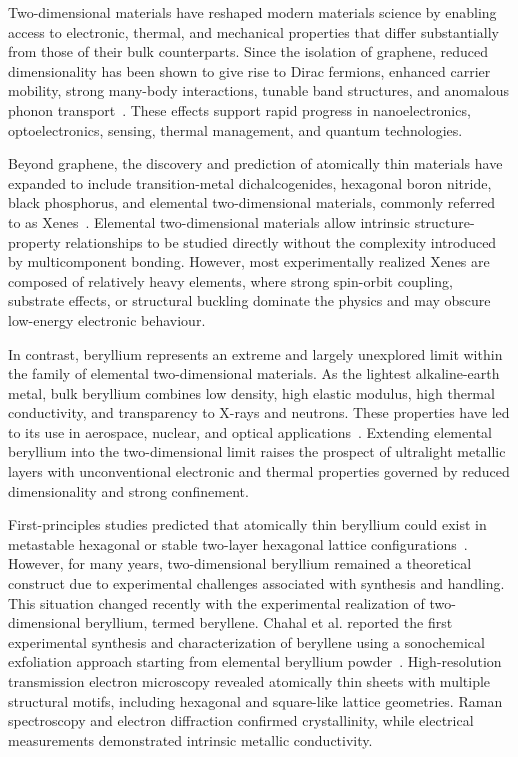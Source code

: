 Two-dimensional materials have reshaped modern materials science by enabling access to electronic,
thermal,
and mechanical properties that differ substantially from those of their bulk counterparts.
Since the isolation of graphene,
reduced dimensionality has been shown to give rise to Dirac fermions,
enhanced carrier mobility,
strong many-body interactions,
tunable band structures,
and anomalous phonon transport~\cite{novoselov2004electric,geim2007rise}.
These effects support rapid progress in nanoelectronics,
optoelectronics,
sensing,
thermal management,
and quantum technologies.

Beyond graphene,
the discovery and prediction of atomically thin materials have expanded to include transition-metal dichalcogenides,
hexagonal boron nitride,
black phosphorus,
and elemental two-dimensional materials,
commonly referred to as Xenes~\cite{butler2013progress,molle2018silicene}.
Elemental two-dimensional materials allow intrinsic structure-property relationships to be studied directly without the complexity introduced by multicomponent bonding.
However,
most experimentally realized Xenes are composed of relatively heavy elements,
where strong spin-orbit coupling,
substrate effects,
or structural buckling dominate the physics and may obscure low-energy electronic behaviour.

In contrast,
beryllium represents an extreme and largely unexplored limit within the family of elemental two-dimensional materials.
As the lightest alkaline-earth metal,
bulk beryllium combines low density,
high elastic modulus,
high thermal conductivity,
and transparency to X-rays and neutrons.
These properties have led to its use in aerospace,
nuclear,
and optical applications~\cite{zheng2020progress}.
Extending elemental beryllium into the two-dimensional limit raises the prospect of ultralight metallic layers with unconventional electronic and thermal properties governed by reduced dimensionality and strong confinement.

First-principles studies predicted that atomically thin beryllium could exist in metastable hexagonal or stable two-layer hexagonal lattice configurations~\cite{ono2020dynamical,hess2022periodicity}.
However,
for many years,
two-dimensional beryllium remained a theoretical construct due to experimental challenges associated with synthesis and handling.
This situation changed recently with the experimental realization of two-dimensional beryllium,
termed beryllene.
Chahal et al. reported the first experimental synthesis and characterization of beryllene using a sonochemical exfoliation approach starting from elemental beryllium powder~\cite{chahal2023beryllene}.
High-resolution transmission electron microscopy revealed atomically thin sheets with multiple structural motifs,
including hexagonal and square-like lattice geometries.
Raman spectroscopy and electron diffraction confirmed crystallinity,
while electrical measurements demonstrated intrinsic metallic conductivity.


